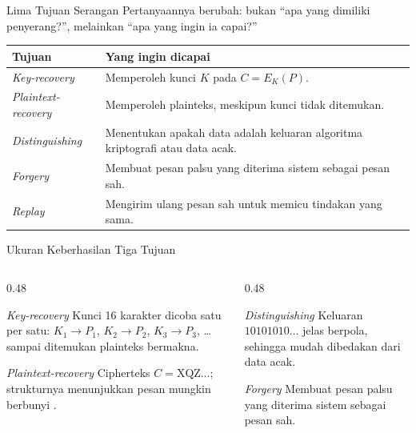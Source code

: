 \documentclass[aspectratio=169,11pt]{beamer}
\begin{document}
\begin{frame}{Lima Tujuan Serangan}
    \footnotesize
    Pertanyaannya berubah: bukan ``apa yang dimiliki penyerang?'', melainkan
    ``apa yang ingin ia capai?''
    \vspace{0.1cm}
    \begin{tabularx}{\linewidth}{@{}>{\raggedright\arraybackslash}p{3.1cm}
        >{\raggedright\arraybackslash}X@{}}
        \toprule
        \textbf{Tujuan} & \textbf{Yang ingin dicapai} \\
        \midrule
        \textit{Key-recovery} & Memperoleh kunci $K$ pada $C=E_K(P)$. \\
        \addlinespace
        \textit{Plaintext-recovery} & Memperoleh plainteks, meskipun kunci
        tidak ditemukan. \\
        \addlinespace
        \textit{Distinguishing} & Menentukan apakah data adalah keluaran
        algoritma kriptografi atau data acak. \\
        \addlinespace
        \textit{Forgery} & Membuat pesan palsu yang diterima sistem sebagai
        pesan sah. \\
        \addlinespace
        \textit{Replay} & Mengirim ulang pesan sah untuk memicu tindakan yang
        sama. \\
        \bottomrule
    \end{tabularx}
\end{frame}

\begin{frame}{Ukuran Keberhasilan Tiga Tujuan}
    \begin{columns}[T,onlytextwidth]
        \begin{column}{0.48\textwidth}
            \begin{block}{\textit{Key-recovery}}
                \footnotesize
                Kunci 16 karakter dicoba satu per satu:
                $K_1\to P_1$, $K_2\to P_2$, $K_3\to P_3$, \dots sampai
                ditemukan plainteks bermakna.
            \end{block}
            \begin{block}{\textit{Plaintext-recovery}}
                \footnotesize
                Cipherteks $C=\text{XQZ}\dots$; strukturnya menunjukkan pesan
                mungkin berbunyi .
            \end{block}
        \end{column}
        \begin{column}{0.48\textwidth}
            \begin{block}{\textit{Distinguishing}}
                \footnotesize
                Keluaran $10101010\dots$ jelas berpola, sehingga mudah
                dibedakan dari data acak.
            \end{block}
            \begin{alertblock}{\textit{Forgery}}
                \footnotesize
                Membuat pesan palsu yang diterima sistem sebagai pesan sah.
            \end{alertblock}
        \end{column}
    \end{columns}
\end{frame}
\end{document}
